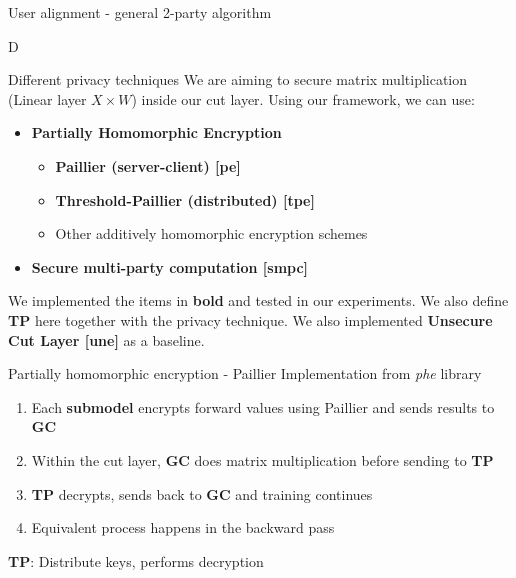\documentclass[xcolor=dvipsnames]{beamer}
\begin{document}
\begin{frame}{User alignment - general 2-party algorithm}
  \begin{algorithm}[H]
    \scriptsize
    \SetAlgoLined
    \Return D\;
  \caption{User-Align}
  \end{algorithm}
\end{frame}

\begin{frame}{Different privacy techniques}
We are aiming to secure matrix multiplication (Linear layer $X\times W$) inside our cut layer.
Using our framework, we can use:
\begin{itemize}
    \item \textbf{Partially Homomorphic Encryption}
        \begin{itemize}
            \item \textbf{Paillier (server-client) [pe]}
            \item \textbf{Threshold-Paillier (distributed) [tpe]}
            \item Other additively homomorphic encryption schemes
        \end{itemize}
    \item \textbf{Secure multi-party computation [smpc]}
\end{itemize}
We implemented the items in \textbf{bold} and tested in our experiments.
We also define \textbf{TP} here together with the privacy technique.
We also implemented \textbf{Unsecure Cut Layer [une]} as a baseline.
\end{frame}

\begin{frame}{Partially homomorphic encryption - Paillier}
Implementation from \textit{phe} library
\begin{enumerate}
    \item Each \textbf{submodel} encrypts forward values using Paillier and sends results to \textbf{GC}
    \item Within the cut layer, \textbf{GC} does matrix multiplication before sending to \textbf{TP}
    \item \textbf{TP} decrypts, sends back to \textbf{GC} and training continues
    \item Equivalent process happens in the backward pass
\end{enumerate}
\textbf{TP}: Distribute keys, performs decryption
\end{frame}
\end{document}

